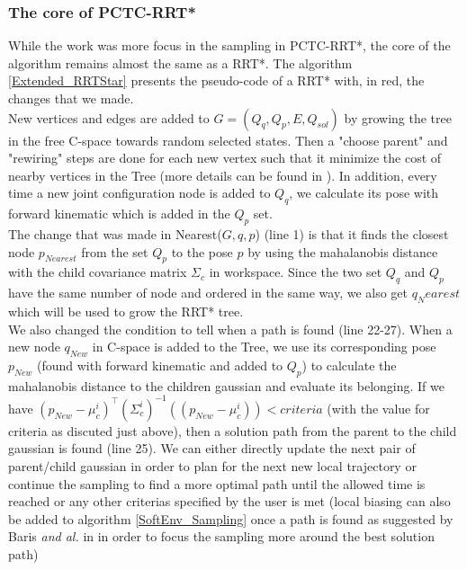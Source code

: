 \documentclass[letterpaper, 10 pt, conference]{ieeeconf}  %
\newcommand{\trsp}{{\!\scriptscriptstyle\top}}
\begin{document}
\subsubsection{The core of PCTC-RRT*}\leavevmode\par \label{coreRRTstarChapter}
While the work was more focus in the sampling in PCTC-RRT*, the core of the algorithm remains almost the same as a RRT*. The algorithm \ref{Extended_RRTStar} presents the pseudo-code of a RRT* with, in red, the changes that we made.\\
New vertices and edges are added to $G=(Q_q,Q_p,E,Q_{sol})$ by growing the tree in the free C-space towards random selected states. Then a "choose parent" and "rewiring" steps are done for each new vertex such that it minimize the cost of nearby vertices in the Tree (more details can be found in \cite{KaramanRRTStar} ). In addition, every time a new joint configuration node is added to $Q_q$, we calculate its pose with forward kinematic which is added in the $Q_p$ set. \\
 The change that was made in {\selectfont Nearest($G,q,p$)} (line 1) is that it finds the closest node  $p_{Nearest}$ from the set $Q_p$ to the pose $p$ by using the mahalanobis distance with the child covariance matrix $\Sigma_c$ in workspace. Since the two set $Q_q$ and $Q_p$ have the same number of node and ordered in the same way, we also get $q_Nearest$ which will be used to grow the RRT* tree.\\
 We also changed the condition to tell when a path is found (line 22-27). When a new node $q_{New}$ in C-space is added to the Tree, we use its corresponding pose $p_{New}$ (found with forward kinematic and added to $Q_p$) to calculate the mahalanobis distance to the children gaussian and evaluate its belonging. If we have $(p_{New}-\mu_{c}^i)^{\trsp}(\Sigma_{c}^i)^{-1} ((p_{New}-\mu_{c}^i)) < criteria$ (with the value for criteria as discuted just above), then a solution path from the parent to the child gaussian  is found (line 25). We can either directly update the next pair of parent/child gaussian in order to plan for the next new local trajectory or continue the sampling to find a more optimal path until the allowed time is reached or any other criterias specified by the user is met (local biasing can also be added to algorithm \ref{SoftEnv_Sampling} once a path is found as suggested by Baris \textit{and al.} in \cite{BarisRRT} in order to focus the sampling more around the best solution path)  \\
 
\end{document}
